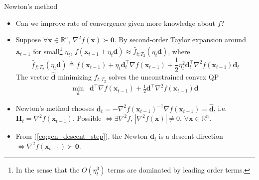 \documentclass{beamer}
\numberwithin{equation}{section}
\newcommand{\aref}[1]{\alert{\ref{#1}}}
\begin{document}
\begin{frame}{Newton's method}
    \begin{itemize}
        \item
        Can we improve rate of convergence given more knowledge about $ f $?

        \item
        Suppose $ \forall \mathbf{x} \in \mathbb{R}^n $,
        $ \nabla^2f(\mathbf{x}) \succ \mathbf{0} $. By second-order Taylor
        expansion around $ \mathbf{x}_{t - 1} $ for small\footnote{
            In the sense that the $ O(\eta_t^3) $ terms are dominated by
            leading order terms.        
        } $ \eta_t $, $ f(\mathbf{x}_{t - 1} + \eta_t\mathbf{d})
        \approx \hat{f}_{t; T_2}(\eta_t\mathbf{d}) $, where
        \begin{equation*}
            \hat{f}_{f; T_2}(\eta_t\mathbf{d}) \triangleq
                f(\mathbf{x}_{t - 1}) + \eta_t\mathbf{d}_t^\top
                \nabla f(\mathbf{x}_{t - 1}) + \frac{1}{2}\eta_t^2
                \mathbf{d}_t^\top\nabla^2f(\mathbf{x}_{t - 1})\mathbf{d}_t
        \end{equation*}
        The vector $ \hat{\mathbf{d}} $ minimizing $ \hat{f}_{t; T_2} $ solves
        the unconstrained convex QP
        \begin{equation} \label{eq:newton_descent_opt}
            \begin{array}{ll}
                \displaystyle\min_{\mathbf{d}} &
                    \mathbf{d}^\top\nabla f(\mathbf{x}_{t - 1}) +
                    \frac{1}{2}\mathbf{d}^\top
                    \nabla^2f(\mathbf{x}_{t - 1})\mathbf{d}
            \end{array}
        \end{equation}

        \item
        Newton's method chooses $ \mathbf{d}_t =
        -\nabla^2f(\mathbf{x}_{t - 1})^{-1}\nabla f(\mathbf{x}_{t - 1}) =
        \hat{\mathbf{d}} $, i.e. $ \mathbf{H}_t =
        \nabla^2f(\mathbf{x}_{t - 1}) $. Possible $ \Leftrightarrow
        \exists\nabla^2f $, $ \left|\nabla^2f(\mathbf{x})\right| \ne 0 $,
        $ \forall \mathbf{x} \in \mathbb{R}^n $.

        \item
        From (\aref{eq:gen_descent_step}), the Newton $ \mathbf{d}_t $ is a
        descent direction $ \Leftrightarrow \nabla^2f(\mathbf{x}_{t - 1})
        \succ \mathbf{0} $.
    \end{itemize}

    \medskip
\end{frame}
\end{document}
